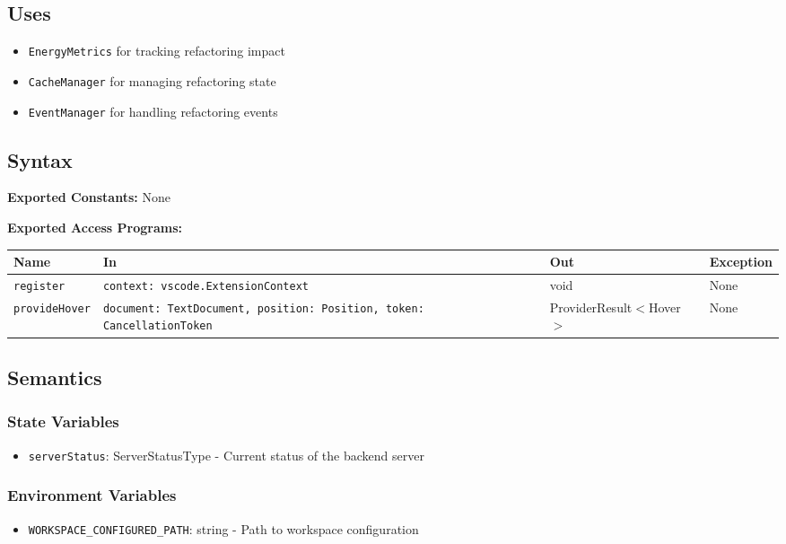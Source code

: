 \documentclass[12pt, titlepage]{article}
\begin{document}
\subsection{Uses}
\begin{itemize}
\item \texttt{EnergyMetrics} for tracking refactoring impact
\item \texttt{CacheManager} for managing refactoring state
\item \texttt{EventManager} for handling refactoring events
\end{itemize}

\subsection{Syntax}

\textbf{Exported Constants:} None

\textbf{Exported Access Programs:}\\

\begin{tabularx}{\linewidth}{|l|>{\raggedright\arraybackslash}X|l|l|}
  \hline
  \textbf{Name} & \textbf{In} & \textbf{Out} & \textbf{Exception} \\
  \hline
  \texttt{register} & \texttt{context: vscode.ExtensionContext} & void & None \\ \hline
  \texttt{provideHover} & \texttt{document: TextDocument, position: Position, token: CancellationToken} & ProviderResult$<$Hover$>$ & None \\
  \hline
\end{tabularx}

\subsection{Semantics}

\subsubsection{State Variables}
\begin{itemize}
\item \texttt{serverStatus}: ServerStatusType - Current status of the backend server
\end{itemize}

\subsubsection{Environment Variables}
\begin{itemize}
\item \texttt{WORKSPACE\_CONFIGURED\_PATH}: string - Path to workspace configuration
\end{itemize}
\end{document}
